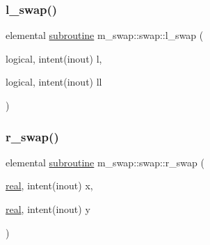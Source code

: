 \mbox{\label{interfacem__swap_1_1swap_ad165c5b42c04e0d29288657076615de6}} 
\subsubsection{\texorpdfstring{l\+\_\+swap()}{l\_swap()}}
{\footnotesize\ttfamily elemental \hyperlink{M__stopwatch_83_8txt_acfbcff50169d691ff02d4a123ed70482}{subroutine} m\+\_\+swap\+::swap\+::l\+\_\+swap (\begin{DoxyParamCaption}\item[{logical, intent(inout)}]{l,  }\item[{logical, intent(inout)}]{ll }\end{DoxyParamCaption})\hspace{0.3cm}{\ttfamily [private]}}

\mbox{\label{interfacem__swap_1_1swap_ac61beb6c8071bd0954ec83e967e51809}} 
\subsubsection{\texorpdfstring{r\+\_\+swap()}{r\_swap()}}
{\footnotesize\ttfamily elemental \hyperlink{M__stopwatch_83_8txt_acfbcff50169d691ff02d4a123ed70482}{subroutine} m\+\_\+swap\+::swap\+::r\+\_\+swap (\begin{DoxyParamCaption}\item[{\hyperlink{read__watch_83_8txt_abdb62bde002f38ef75f810d3a905a823}{real}, intent(inout)}]{x,  }\item[{\hyperlink{read__watch_83_8txt_abdb62bde002f38ef75f810d3a905a823}{real}, intent(inout)}]{y }\end{DoxyParamCaption})\hspace{0.3cm}{\ttfamily [private]}}

\mbox{\label{interfacem__swap_1_1swap_a1876fd6b10405d2834a760ba8e006bbf}} 
